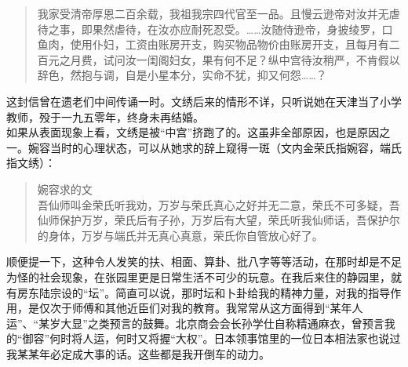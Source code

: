\begin{quote}
	我家受清帝厚恩二百余载，我祖我宗四代官至一品。且慢云逊帝对汝并无虐待之事，即果然虐待，在汝亦应耐死忍受。……汝随侍逊帝，身披绫罗，口鱼肉，使用仆妇，工资由账房开支，购买物品物价由账房开支，且每月有二百元之月费，试问汝一闺阁妇女，果有何不足？纵中宫待汝稍严，不肯假以辞色，然抱与调，自是小星本分，实命不犹，抑又何怨……？\\
\end{quote}

这封信曾在遗老们中间传诵一时。文绣后来的情形不详，只听说她在天津当了小学教师，殁于一九五零年，终身未再结婚。\\

如果从表面现象上看，文绣是被“中宫”挤跑了的。这虽非全部原因，也是原因之一。婉容当时的心理状态，可以从她求的辞上窥得一斑（文内金荣氏指婉容，端氏指文绣）：\\

\begin{quote}
	婉容求的文\\

吾仙师叫金荣氏听我劝，万岁与荣氏真心之好并无二意，荣氏不可多疑，吾仙师保护万岁，荣氏后有子孙，万岁后有大望，荣氏听我仙师话，吾保护尔的身体，万岁与端氏并无真心真意，荣氏你自管放心好了。\\
\end{quote}

顺便提一下，这种令人发笑的扶、相面、算卦、批八字等等活动，在那时却是不足为怪的社会现象，在张园里更是日常生活不可少的玩意。在我后来住的静园里，就有房东陆宗设的“坛”。简直可以说，那时坛和卜卦给我的精神力量，对我的指导作用，是仅次于师傅和其他近臣们对我的教育。我常常从这方面得到“某年人运”、“某岁大显”之类预言的鼓舞。北京商会会长孙学仕自称精通麻衣，曾预言我的“御容”何时将人运，何时又将握“大权”。日本领事馆里的一位日本相法家也说过我某某年必定成大事的话。这些都是我开倒车的动力。
